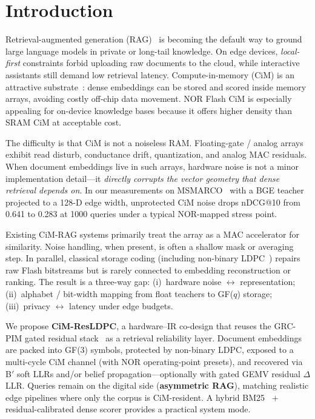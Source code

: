 \documentclass[sigconf,review,anonymous]{acmart}
\begin{document}

\maketitle

\section{Introduction}
Retrieval-augmented generation (RAG)~\cite{lewis2020rag,guu2020realm} is becoming the default way to ground large language models in private or long-tail knowledge.
On edge devices, \emph{local-first} constraints forbid uploading raw documents to the cloud, while interactive assistants still demand low retrieval latency.
Compute-in-memory (CiM) is an attractive substrate~\cite{sebastian2017pcm,shafiee2016isaac}: dense embeddings can be stored and scored inside memory arrays, avoiding costly off-chip data movement.
NOR Flash CiM is especially appealing for on-device knowledge bases because it offers higher density than SRAM CiM at acceptable cost.

The difficulty is that CiM is not a noiseless RAM.
Floating-gate / analog arrays exhibit read disturb, conductance drift, quantization, and analog MAC residuals.
When document embeddings live in such arrays, hardware noise is not a minor implementation detail---it \emph{directly corrupts the vector geometry that dense retrieval depends on}.
In our measurements on MSMARCO~\cite{nguyen2016msmarco} with a BGE teacher projected to a 128-D edge width, unprotected CiM noise drops nDCG@10 from 0.641 to 0.283 at 1000 queries under a typical NOR-mapped stress point.

Existing CiM-RAG systems primarily treat the array as a MAC accelerator for similarity.
Noise handling, when present, is often a shallow mask or averaging step.
In parallel, classical storage coding (including non-binary LDPC~\cite{davey1998nbldpc}) repairs raw Flash bitstreams but is rarely connected to embedding reconstruction or ranking.
The result is a three-way gap: (i)~hardware noise $\leftrightarrow$ representation; (ii)~alphabet / bit-width mapping from float teachers to GF($q$) storage; (iii)~privacy $\leftrightarrow$ latency under edge budgets.

We propose \textbf{CiM-ResLDPC}, a hardware--IR co-design that reuses the GRC-PIM gated residual stack~\cite{grcpim2025} as a retrieval reliability layer.
Document embeddings are packed into GF(3) symbols, protected by non-binary LDPC, exposed to a multi-cycle CiM channel (with NOR operating-point presets), and recovered via B$'$ soft LLRs and/or belief propagation---optionally with gated GEMV residual $\Delta$LLR.
Queries remain on the digital side (\textbf{asymmetric RAG}), matching realistic edge pipelines where only the corpus is CiM-resident.
A hybrid BM25~\cite{robertson2009bm25} $+$ residual-calibrated dense scorer provides a practical system mode.
\end{document}
